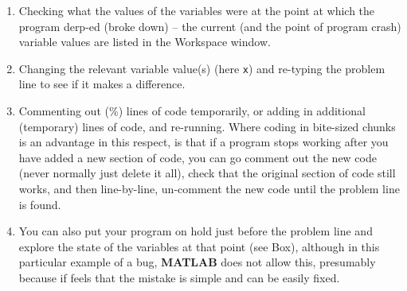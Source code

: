 \documentclass{tufte-book} %
\begin{document}
\begin{enumerate}[noitemsep]
\setlength{\itemindent}{.2in}
\vspace{0mm}
\item Checking  what the values of the variables were at the point at which the program derp-ed (broke down) -- the current (and the point of program crash) variable values are listed in the \textsf{Workspace window}.
\vspace{1mm}
\item Changing the relevant variable value(s) (here \texttt{x}) and re-typing the problem line to see if it makes a difference.
\vspace{1mm}
\item Commenting out (\textcolor[rgb]{0,0.501961,0}{\%}) lines of code temporarily, or adding in additional (temporary) lines of code, and re-running. Where coding in bite-sized chunks is an advantage in this respect, is that if a program stops working after you have added a new section of code, you can go comment out the new code (never normally just delete it all), check that the original section of code still works, and then line-by-line, un-comment the new code until the problem line is found.
\vspace{1mm}
\item You can also put your program on hold just before the problem line and explore the state of the variables at that point (see Box), although in this particular example of a bug, \textbf{MATLAB} does not allow this, presumably because if feels that the mistake is simple and can be easily fixed. 
\end{enumerate}

\end{document}
